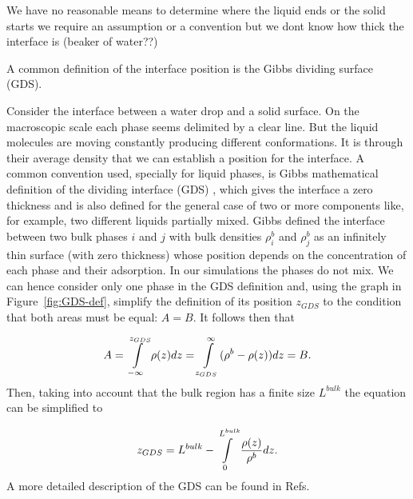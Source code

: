 We have no reasonable means to determine where the liquid ends or
the solid starts we require an assumption or a convention but we dont
know how thick the interface is (beaker of water??)

A common definition of the interface position is the Gibbs dividing
surface (GDS).

Consider the interface between a water drop and a solid surface. On
the macroscopic scale each phase seems delimited by a clear line.
But the liquid molecules are moving constantly producing different
conformations. It is through their average density that we can establish
a position for the interface. A common convention used, specially
for liquid phases, is Gibbs mathematical definition of the dividing
interface (GDS) \cite{gibbs:1948}, which gives the interface a zero
thickness and is also defined for the general case of two or more
components like, for example, two different liquids partially mixed.
Gibbs defined the interface between two bulk phases $i$ and $j$
with bulk densities $\rho_{i}^{b}$ and $\rho_{j}^{b}$ as an infinitely
thin surface (with zero thickness) whose position depends on the concentration
of each phase and their adsorption. In our simulations the phases
do not mix. We can hence consider only one phase in the GDS definition
and, using the graph in Figure~\ref{fig:GDS-def}, simplify the definition
of its position $z_{GDS}$ to the condition that both areas must be
equal: $A=B$. It follows then that

\begin{equation}
A=\intop_{-\infty}^{z_{GDS}}\rho(z)dz=\intop_{z_{GDS}}^{\infty}(\rho^{b}-\rho(z))dz=B.
\end{equation}
Then, taking into account that the bulk region has a finite size $L^{bulk}$
the equation can be simplified to

\begin{equation}
z_{GDS}=L^{bulk}-\intop_{0}^{L^{bulk}}\frac{\rho(z)}{\rho^{b}}dz.\label{eq:GDS-final}
\end{equation}
A more detailed description of the GDS can be found in Refs. \cite{gumma:2003,levitas:2014,lang:2012}